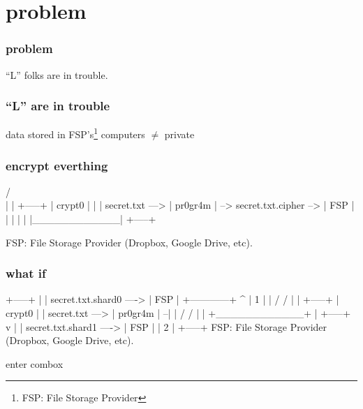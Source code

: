 
\section{problem}

\begin{frame}
  \frametitle{problem}
  \centering
  ``L'' folks are in trouble.
\end{frame}

\begin{frame}
  \frametitle{``L'' are in trouble}
  \centering
  data stored in FSP's\footnote{FSP: File Storage Provider} computers $\ne$ private
\end{frame}

\begin{frame}[fragile]
  \frametitle{encrypt everthing}
  {\tiny
  \begin{semiverbatim}
                        /^^^^^^^^^^^^\\
                        |            |                           +-----+
                        |  crypt0    |                           |     |
        secret.txt ---> |  pr0gr4m   | --> secret.txt.cipher --> | FSP |
                        |            |                           |     |
                        |____________|                           +-----+

     FSP: File Storage Provider (Dropbox, Google Drive, etc).
  \end{semiverbatim}
  }
\end{frame}

\begin{frame}[fragile]
  \frametitle{what if}

  {\tiny
  \begin{semiverbatim}
                                                             +-----+
                                                             |     |
                                  secret.txt.shard0   ---->  | FSP |
                   +------------+   ^                        |  1  |
                   |  /     /   |   |                        +-----+
                   |  crypt0    |   |
   secret.txt ---> |  pr0gr4m   | --|
                   | /     /    |   |
                   +____________+   |                        +-----+
                                    v                        |     |
                                  secret.txt.shard1   ---->  | FSP |
                                                             |  2  |
                                                             +-----+
FSP: File Storage Provider (Dropbox, Google Drive, etc).
  \end{semiverbatim}
  }

\end{frame}

\begin{frame}
  \centering
  enter combox
\end{frame}
